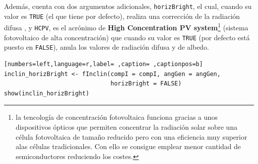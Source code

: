 \begin{itemize}
Además, cuenta con dos argumentos adicionales, \texttt{horizBright}, el cual, cuando su valor es \texttt{TRUE} (el que tiene por defecto), realiza una corrección de la radiación difusa \cite{REINDL19909}, y \texttt{HCPV}, es el acrónimo de \textbf{High Concentration PV system}\footnote{la tencología de concentración fotovoltaica funciona gracias a unos dispositivos ópticos que permiten concentrar la radiación solar sobre una célula fotovoltaica de tamaño reducido pero con una eficiencia muy superior alas células tradicionales. Con ello se consigue emplear menor cantidad de semiconductores reduciendo los costes.} (sistema fotovoltaico de alta concentración) que cuando su valor es \texttt{TRUE} (por defecto está puesto en \texttt{FALSE}), anula los valores de radiación difusa y de albedo.
\begin{lstlisting}[numbers=left,language=r,label= ,caption= ,captionpos=b]
inclin_horizBright <- fInclin(compI = compI, angGen = angGen,
                              horizBright = FALSE)
show(inclin_horizBright)
\end{lstlisting}


\end{itemize}
